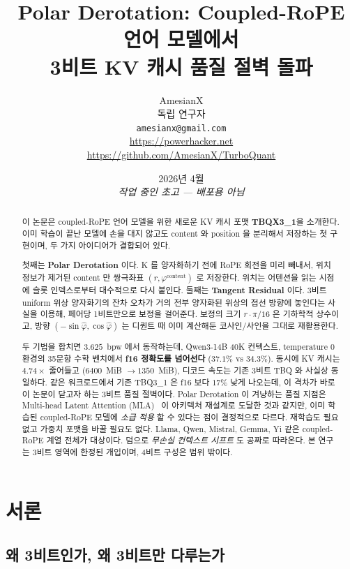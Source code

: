 \documentclass[10pt,twocolumn]{article}
\title{Polar Derotation: Coupled-RoPE 언어 모델에서\\3비트 KV 캐시 품질 절벽 돌파}
\author{
AmesianX\\
독립 연구자\\
\texttt{amesianx@gmail.com}\\
\url{https://powerhacker.net}\\
\url{https://github.com/AmesianX/TurboQuant}
}
\date{2026년 4월 \\ \textit{작업 중인 초고 --- 배포용 아님}}
\begin{document}
\maketitle

\begin{abstract}
이 논문은 coupled-RoPE 언어 모델을 위한 새로운 KV 캐시 포맷 \textbf{TBQX3\_1}을 소개한다. 이미 학습이 끝난 모델에 손을 대지 않고도 content 와 position 을 분리해서 저장하는 첫 구현이며, 두 가지 아이디어가 결합되어 있다.

첫째는 \textbf{Polar Derotation} 이다. K 를 양자화하기 전에 RoPE 회전을 미리 빼내서, 위치 정보가 제거된 content 만 쌍극좌표 $(r,\varphi^{\text{content}})$ 로 저장한다. 위치는 어텐션을 읽는 시점에 슬롯 인덱스로부터 대수적으로 다시 붙인다. 둘째는 \textbf{Tangent Residual} 이다. 3비트 uniform 위상 양자화기의 잔차 오차가 거의 전부 양자화된 위상의 접선 방향에 놓인다는 사실을 이용해, 페어당 1비트만으로 보정을 걸어준다. 보정의 크기 $r\cdot\pi/16$ 은 기하학적 상수이고, 방향 $(-\sin\hat\varphi,\cos\hat\varphi)$ 는 디퀀트 때 이미 계산해둔 코사인/사인을 그대로 재활용한다.

두 기법을 합치면 $3.625$~bpw 에서 동작하는데, Qwen3-14B 40K 컨텍스트, temperature $0$ 환경의 35문항 수학 벤치에서 \textbf{f16 정확도를 넘어선다} ($37.1\%$ vs $34.3\%$). 동시에 KV 캐시는 $4.74\times$ 줄어들고 ($6400$~MiB $\to 1350$~MiB), 디코드 속도는 기존 3비트 TBQ 와 사실상 동일하다. 같은 워크로드에서 기존 TBQ3\_1 은 f16 보다 $17\%$ 낮게 나오는데, 이 격차가 바로 이 논문이 닫고자 하는 3비트 품질 절벽이다. Polar Derotation 이 겨냥하는 품질 지점은 Multi-head Latent Attention (MLA)~\cite{deepseekv2} 이 아키텍처 재설계로 도달한 것과 같지만, 이미 학습된 coupled-RoPE 모델에 \emph{소급 적용} 할 수 있다는 점이 결정적으로 다르다. 재학습도 필요 없고 가중치 포맷을 바꿀 필요도 없다. Llama, Qwen, Mistral, Gemma, Yi 같은 coupled-RoPE 계열 전체가 대상이다. 덤으로 \emph{무손실 컨텍스트 시프트} 도 공짜로 따라온다. 본 연구는 3비트 영역에 한정된 개입이며, 4비트 구성은 범위 밖이다.
\end{abstract}

\section{서론}
\label{sec:intro}

\subsection{왜 3비트인가, 왜 3비트만 다루는가}
\label{sec:why3bit}
\end{document}
